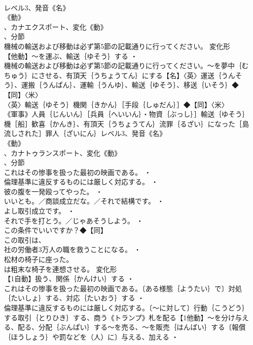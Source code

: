 \documentclass[8pt]{extreport}
\begin{document}
\begin{CJK}{UTF8}{min}
\\	レベル3、発音《名》
\\	《動》
\\	、カナエクスポート、変化《動》
\\	、分節
\\	機械の輸送および移動は必ず第5節の記載通りに行ってください。	変化形 
\\	【他動】～を運ぶ、輸送｛ゆそう｝する ・
\\	機械の輸送および移動は必ず第5節の記載通りに行ってください。～を夢中｛むちゅう｝にさせる、有頂天｛うちょうてん｝にする【名】〈英〉運送｛うんそう｝、運搬｛うんぱん｝、運輸｛うんゆ｝、輸送｛ゆそう｝、移送｛いそう｝◆【同】〈米〉
\\	〈英〉輸送｛ゆそう｝機関｛きかん｝［手段｛しゅだん｝］◆【同】〈米〉
\\	《軍事》人員｛じんいん｝［兵員｛へいいん｝・物資｛ぶっし｝］輸送｛ゆそう｝機［船］歓喜｛かんき｝、有頂天｛うちょうてん｝流罪｛るざい｝になった［島流しされた］罪人｛ざいにん｝レベル3、発音《名》
\\	《動》
\\	、カナトゥランスポート、変化《動》
\\	、分節
\\	これはその惨事を扱った最初の映画である。 ・
\\	倫理基準に違反するものには厳しく対応する。 ・
\\	彼の腹を一発殴ってやった。 ・
\\	いいとも。／商談成立だな。／それで結構です。 ・
\\	よし取引成立です。 ・
\\	それで手を打とう。／じゃあそうしよう。 ・
\\	この条件でいいですか？◆【同】
\\	この取引は、
\\	社の労働者3万人の職を救うことになる。 ・
\\	松材の椅子に座った。
\\	は粗末な椅子を連想させる。	変化形 
\\	【1自動】扱う、関係｛かんけい｝する ・
\\	これはその惨事を扱った最初の映画である。〔ある様態｛ようたい｝で〕対処｛たいしょ｝する、対応｛たいおう｝する ・
\\	倫理基準に違反するものには厳しく対応する。〔～に対して〕行動｛こうどう｝する取引｛とりひき｝する、商う《トランプ》札を配る【1他動】～を分け与える、配る、分配｛ぶんぱい｝する～を売る、～を販売｛はんばい｝する〔報償｛ほうしょう｝や罰などを（人）に〕与える、加える ・

\end{CJK}
\end{document}
